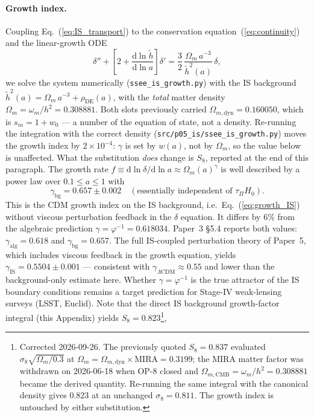 \paragraph{Growth index.}
Coupling Eq.~(\ref{eq:IS_transport}) to the conservation
equation~(\ref{eq:continuity}) and the linear-growth ODE
%
\begin{equation}
  \delta'' + \left[2 + \frac{\mathrm{d}\ln\tilde{h}}{\mathrm{d}\ln a}\right]\delta'
  = \frac{3}{2}\,\frac{\Omega_{m}\,a^{-3}}{\tilde{h}^{2}(a)}\,\delta,
  \label{eq:growth_IS}
\end{equation}
%
we solve the system numerically (\texttt{ssee\_is\_growth.py}) with
the IS background $\tilde{h}^{2}(a) = \Omega_{m}\,a^{-3}+\rho_{\mathrm{DE}}(a)$,
with the \emph{total} matter density $\Omega_{m}=\omega_m/h^{2}=0.308881$.
Both slots previously carried $\Omega_{m,\mathrm{dyn}}=0.160050$, which is
$s_m = 1+w_0$ --- a number of the equation of state, not a density. Re-running
the integration with the correct density (\texttt{src/p05\_is/ssee\_is\_growth.py})
moves the growth index by $2\times10^{-4}$: $\gamma$ is set by $w(a)$, not by
$\Omega_m$, so the value below is unaffected. What the substitution \emph{does}
change is $S_8$, reported at the end of this paragraph.
The growth rate $f \equiv \mathrm{d}\ln\delta/\mathrm{d}\ln a \approx \Omega_{m}(a)^{\gamma}$
is well described by a power law over $0.1 \leq a \leq 1$ with
%
\begin{equation}
  \gamma_{\mathrm{bg}} = 0.657 \pm 0.002
  \quad(\text{essentially independent of }\tau_{\Pi} H_{0}).
  \label{eq:gamma_IS}
\end{equation}
%
This is the CDM growth index on the IS background, i.e.\ Eq.~(\ref{eq:growth_IS})
without viscous perturbation feedback in the $\delta$ equation.
It differs by 6\% from the algebraic prediction $\gamma = \varphi^{-1} = 0.618034$.
Paper~3 \S5.4 reports both values: $\gamma_\mathrm{alg}=0.618$ and $\gamma_\mathrm{bg}=0.657$.
The full IS-coupled perturbation theory of Paper~5, which includes viscous
feedback in the growth equation, yields
$\gamma_{\mathrm{IS}} = 0.5504 \pm 0.001$ — consistent with $\gamma_{\Lambda\mathrm{CDM}} \approx 0.55$
and lower than the background-only estimate here.
Whether $\gamma = \varphi^{-1}$ is the true attractor of the IS boundary conditions
remains a target prediction for Stage-IV weak-lensing surveys (LSST, Euclid).
Note that the direct IS background growth-factor integral (this Appendix) yields
$S_8=0.823$\footnote{Corrected 2026-09-26. The previously quoted $S_8=0.837$ evaluated
$\sigma_8\sqrt{\Omega_m/0.3}$ at $\Omega_{m}=\Omega_{m,\mathrm{dyn}}\times\mathrm{MIRA}=0.3199$;
the MIRA matter factor was withdrawn on 2026-06-18 when OP-8 closed and
$\Omega_{m,\mathrm{CMB}}=\omega_m/h^{2}=0.308881$ became the derived quantity. Re-running the
same integral with the canonical density gives $0.823$ at an unchanged $\sigma_8=0.811$. The
growth index is untouched by either substitution.},

